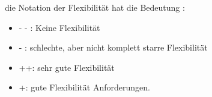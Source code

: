 \documentclass[enabledeprecatedfontcommands,fontsize=12pt,paper=a4,twoside]{scrartcl}
\begin{document}


die Notation der Flexibilität hat die  Bedeutung :
\begin{itemize}
    \item - - : Keine Flexibilität
    \item - : schlechte, aber nicht komplett starre Flexibilität
    \item ++: sehr gute Flexibilität
    \item +: gute Flexibilität
      Anforderungen.
  \end{itemize} 
\end{document}
